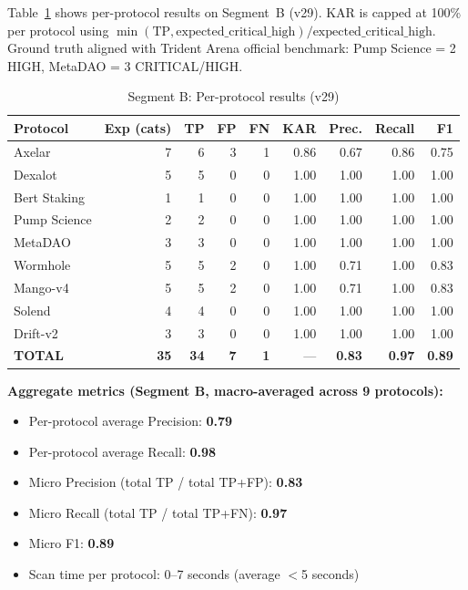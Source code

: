 \documentclass{article}
\begin{document}
Table~\ref{tab:seg_b} shows per-protocol results on Segment~B (v29). KAR is capped at 100\% per protocol using $\min(\text{TP}, \text{expected\_critical\_high}) / \text{expected\_critical\_high}$. Ground truth aligned with Trident Arena official benchmark: Pump Science = 2 HIGH, MetaDAO = 3 CRITICAL/HIGH.

\begin{table}[H]
  \caption{Segment B: Per-protocol results (v29)}
  \label{tab:seg_b}
  \centering
  \begin{tabular}{lrrrrrrrr}
    \toprule
    Protocol & Exp (cats) & TP & FP & FN & KAR & Prec. & Recall & F1 \\
    \midrule
    Axelar & 7 & 6 & 3 & 1 & 0.86 & 0.67 & 0.86 & 0.75 \\
    Dexalot & 5 & 5 & 0 & 0 & 1.00 & 1.00 & 1.00 & 1.00 \\
    Bert Staking & 1 & 1 & 0 & 0 & 1.00 & 1.00 & 1.00 & 1.00 \\
    Pump Science & 2 & 2 & 0 & 0 & 1.00 & 1.00 & 1.00 & 1.00 \\
    MetaDAO & 3 & 3 & 0 & 0 & 1.00 & 1.00 & 1.00 & 1.00 \\
    Wormhole & 5 & 5 & 2 & 0 & 1.00 & 0.71 & 1.00 & 0.83 \\
    Mango-v4 & 5 & 5 & 2 & 0 & 1.00 & 0.71 & 1.00 & 0.83 \\
    Solend & 4 & 4 & 0 & 0 & 1.00 & 1.00 & 1.00 & 1.00 \\
    Drift-v2 & 3 & 3 & 0 & 0 & 1.00 & 1.00 & 1.00 & 1.00 \\
    \midrule
    \textbf{TOTAL} & \textbf{35} & \textbf{34} & \textbf{7} & \textbf{1} & --- & \textbf{0.83} & \textbf{0.97} & \textbf{0.89} \\
    \bottomrule
  \end{tabular}
\end{table}

\textbf{Aggregate metrics (Segment B, macro-averaged across 9 protocols):}
\begin{itemize}
  \item Per-protocol average Precision: \textbf{0.79}
  \item Per-protocol average Recall: \textbf{0.98}
  \item Micro Precision (total TP / total TP+FP): \textbf{0.83}
  \item Micro Recall (total TP / total TP+FN): \textbf{0.97}
  \item Micro F1: \textbf{0.89}
  \item Scan time per protocol: 0--7 seconds (average $<$5 seconds)
\end{itemize}
\end{document}
